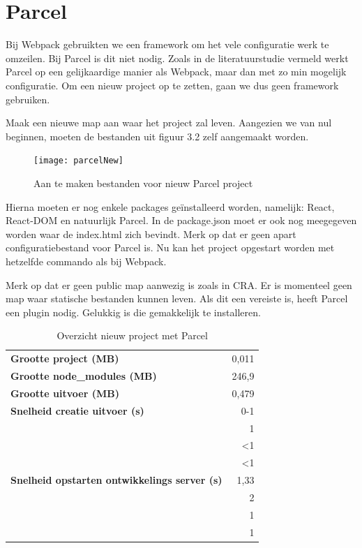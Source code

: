 \section{Parcel}
Bij Webpack gebruikten we een framework om het vele configuratie werk te omzeilen. Bij Parcel is dit niet nodig. Zoals in de literatuurstudie vermeld werkt Parcel op een gelijkaardige manier als Webpack, maar dan met zo min mogelijk configuratie. Om een nieuw project op te zetten, gaan we dus geen framework gebruiken.

Maak een nieuwe map aan waar het project zal leven. Aangezien we van nul beginnen, moeten de bestanden uit figuur 3.2 zelf aangemaakt worden.

\begin{figure}[h]
   \texttt{[image: parcelNew]}
       \centering
       \caption{Aan te maken bestanden voor nieuw Parcel project}
   \end{figure}

Hierna moeten er nog enkele packages geïnstalleerd worden, namelijk: React, React-DOM en natuurlijk Parcel. In de package.json moet er ook nog meegegeven worden waar de index.html zich bevindt. Merk op dat er geen apart configuratiebestand voor Parcel is. Nu kan het project opgestart worden met hetzelfde commando als bij Webpack.

 Merk op dat er geen public map aanwezig is zoals in CRA. Er is momenteel geen map waar statische bestanden kunnen leven. Als dit een vereiste is, heeft Parcel een plugin nodig. Gelukkig is die gemakkelijk te installeren.

\begin{table}[h]
   \centering
   \begin{tabular}{lr}
   \textbf{Grootte project (MB)} & 0,011 \\
   \textbf{Grootte node\_modules (MB)} & 246,9 \\
   \textbf{Grootte uitvoer (MB)} & 0,479 \\
   \textbf{Snelheid creatie uitvoer (s)} & 0-1 \\
   \textbf{} & 1 \\
   \textbf{} & <1 \\
   \textbf{} & <1 \\
   \textbf{Snelheid opstarten ontwikkelings server (s)} & 1,33 \\
   \textbf{} & 2 \\
   \textbf{} & 1 \\
   \textbf{} & 1
   \end{tabular}
   \caption{Overzicht nieuw project met Parcel}
   \end{table}


